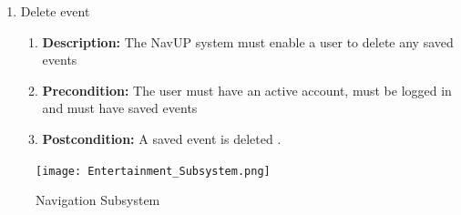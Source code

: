 \documentclass{article}
\begin{document}
\begin{enumerate}
\begin{enumerate}
		\item Delete event
		\begin{enumerate}
			\item \textbf{Description:} The NavUP system must enable a user to delete any saved events
			\item \textbf{Precondition:} The user must have an active account, must be logged in and must have saved events
			\item \textbf{Postcondition:} A saved event is deleted .\newline
		\end{enumerate}
	\end{enumerate}
	\begin{figure}[h!]
		\texttt{[image: Entertainment\_Subsystem.png]}
		\caption{Navigation Subsystem}	
	\end{figure}	
	

\end{enumerate}
\end{document}
